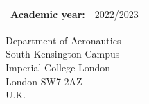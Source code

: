 \begin{titlepage}
\begin{tabular}{rl}
\\
{\bf    Academic year:} & {2022/2023}     


  
\end{tabular}

\begin{center}

{Department of Aeronautics\\
South Kensington Campus\\
Imperial College London\\
London SW7 2AZ\\
U.K.\\}
\end{center}

\vspace{0.5cm}

\vfill %

\end{titlepage}  
